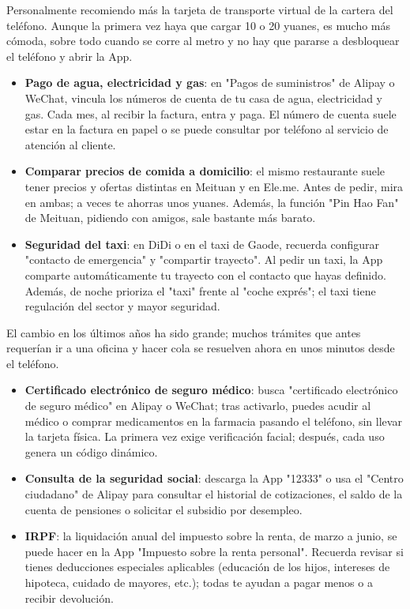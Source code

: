 Personalmente recomiendo más la tarjeta de transporte virtual de la cartera del teléfono. Aunque la primera vez haya que cargar 10 o 20 yuanes, es mucho más cómoda, sobre todo cuando se corre al metro y no hay que pararse a desbloquear el teléfono y abrir la App.


\begin{itemize}
  \item \textbf{Pago de agua, electricidad y gas}: en "Pagos de suministros" de Alipay o WeChat, vincula los números de cuenta de tu casa de agua, electricidad y gas. Cada mes, al recibir la factura, entra y paga. El número de cuenta suele estar en la factura en papel o se puede consultar por teléfono al servicio de atención al cliente.
  \item \textbf{Comparar precios de comida a domicilio}: el mismo restaurante suele tener precios y ofertas distintas en Meituan y en Ele.me. Antes de pedir, mira en ambas; a veces te ahorras unos yuanes. Además, la función "Pin Hao Fan" de Meituan, pidiendo con amigos, sale bastante más barato.
  \item \textbf{Seguridad del taxi}: en DiDi o en el taxi de Gaode, recuerda configurar "contacto de emergencia" y "compartir trayecto". Al pedir un taxi, la App comparte automáticamente tu trayecto con el contacto que hayas definido. Además, de noche prioriza el "taxi" frente al "coche exprés"; el taxi tiene regulación del sector y mayor seguridad.
\end{itemize}


El cambio en los últimos años ha sido grande; muchos trámites que antes requerían ir a una oficina y hacer cola se resuelven ahora en unos minutos desde el teléfono.

\begin{itemize}
  \item \textbf{Certificado electrónico de seguro médico}: busca "certificado electrónico de seguro médico" en Alipay o WeChat; tras activarlo, puedes acudir al médico o comprar medicamentos en la farmacia pasando el teléfono, sin llevar la tarjeta física. La primera vez exige verificación facial; después, cada uso genera un código dinámico.
  \item \textbf{Consulta de la seguridad social}: descarga la App "12333" o usa el "Centro ciudadano" de Alipay para consultar el historial de cotizaciones, el saldo de la cuenta de pensiones o solicitar el subsidio por desempleo.
  \item \textbf{IRPF}: la liquidación anual del impuesto sobre la renta, de marzo a junio, se puede hacer en la App "Impuesto sobre la renta personal". Recuerda revisar si tienes deducciones especiales aplicables (educación de los hijos, intereses de hipoteca, cuidado de mayores, etc.); todas te ayudan a pagar menos o a recibir devolución.
\end{itemize}

